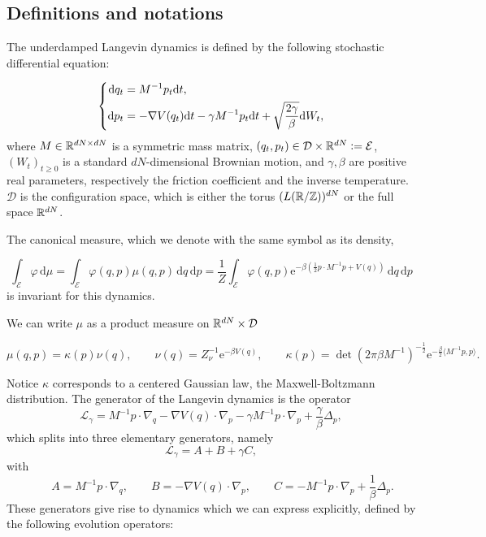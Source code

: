 \subsection{Definitions and notations}\label{defs}
The underdamped Langevin dynamics is defined by the following stochastic differential equation:

\begin{equation}\label{Langevin}
  \left\{\begin{aligned}
      \mathrm{d}q_t&=M^{-1}p_t\mathrm{d}t,\\
      \mathrm{d}p_t&= -\nabla V(q_t)\mathrm{d}t -\gamma M^{-1}p_t\mathrm{d}t+\sqrt{\frac{2\gamma}\beta}\mathrm{d}W_t,
  \end{aligned}\right.
\end{equation}
where $M\in \mathbb{R}^{dN\times dN}$ is a symmetric mass matrix, $(q_t,p_t)\in \mathcal D\times \mathbb{R}^{dN}\mathrel{\mathop:}= \mathcal E$, $(W_t)_{t\geq 0}$ is a standard $dN$-dimensional Brownian motion, 
and $\gamma, \beta$ are positive real parameters, respectively the friction coefficient and the inverse temperature. $\mathcal D$ is the configuration space, which is either the torus $(L(\mathbb{R} / \mathbb Z))^{dN}$ or the full space $\mathbb{R}^{dN}$.

The canonical measure, which we denote with the same symbol as its density, 

\begin{equation}
\label{canonical measure}
\int_{\mathcal E} \varphi\,\mathrm{d}\mu=\int _{\mathcal E}\varphi(q,p)\mu(q,p)\,\mathrm{d}q\,\mathrm{d}p =\frac 1 Z\int_{\mathcal E} \varphi(q,p) \mathrm{e}^{-\beta\left(\frac 12 p\cdot M^{-1}p + V(q)\right)}\,\mathrm{d}q\,\mathrm{d}p
\end{equation}
is invariant for this dynamics.

We can write $\mu$ as a product measure on $\mathbb{R}^{dN}\times \mathcal D$

\begin{equation}
\label{tensor form}
\mu(q,p)=\kappa(p)\nu(q), \qquad \nu(q)=Z_{\nu}^{-1}\mathrm{e}^{-\beta V(q)},\qquad \kappa(p)=\det\left(2\pi\beta M^{-1}\right)^{-\frac 12}\mathrm{e}^{-\frac\beta 2\langle M^{-1}p,p\rangle}.
\end{equation}

Notice $\kappa$ corresponds to a centered Gaussian law, the Maxwell-Boltzmann distribution.
The generator of the Langevin dynamics is the operator
\begin{equation}
  \label{Langevin generator}
\mathcal L_\gamma=M^{-1}p\cdot \nabla_q-\nabla V(q) \cdot \nabla_p- \gamma M^{-1} p \cdot \nabla_p+\frac\gamma\beta \Delta_p,
\end{equation}
which splits into three elementary generators, namely 
$$\mathcal L_\gamma= A+B+\gamma C,$$
with
\begin{equation}
  \label{Langevin generator splitting}
\qquad A=M^{-1}p\cdot \nabla_q,\qquad B=-\nabla V(q) \cdot \nabla_p,\qquad C=-M^{-1}p\cdot \nabla_p +\frac1\beta \Delta_p.
\end{equation}
These generators give rise to dynamics which we can express explicitly, defined by the following evolution operators:

